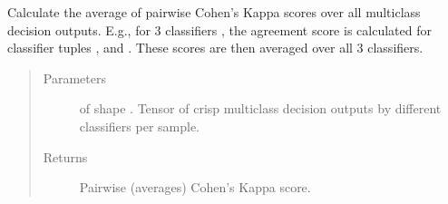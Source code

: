 \documentclass[letterpaper,10pt,english]{sphinxmanual}
\begin{document}
\begin{fulllineitems}
\label{\detokenize{pusion.evaluation.evaluation_metrics:pusion.evaluation.evaluation_metrics.pairwise_cohens_kappa}}
\sphinxAtStartPar
Calculate the average of pairwise Cohen’s Kappa scores over all multiclass decision outputs.
E.g., for 3 classifiers , the agreement score is calculated for classifier tuples ,  and
. These scores are then averaged over all 3 classifiers.
\begin{quote}\begin{description}
\item[{Parameters}] \leavevmode
\sphinxAtStartPar
{} \textendash{}  of shape .
Tensor of crisp multiclass decision outputs by different classifiers per sample.

\item[{Returns}] \leavevmode
\sphinxAtStartPar
Pairwise (averages) Cohen’s Kappa score.

\end{description}\end{quote}

\end{fulllineitems}

\end{document}
